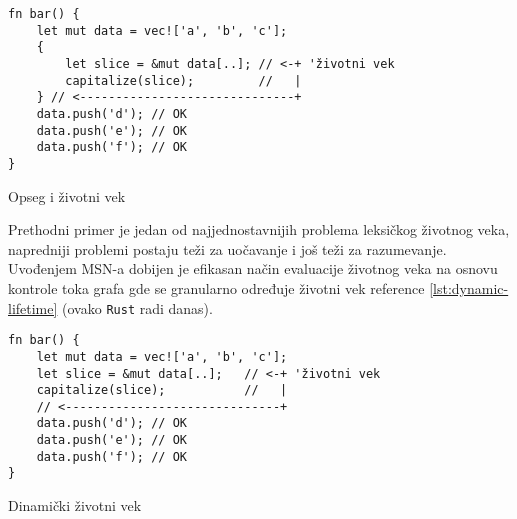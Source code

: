 \begin{listing}[H]
\begin{verbatim}
fn bar() {
    let mut data = vec!['a', 'b', 'c'];
    {
        let slice = &mut data[..]; // <-+ 'životni vek
        capitalize(slice);         //   |
    } // <------------------------------+
    data.push('d'); // OK
    data.push('e'); // OK
    data.push('f'); // OK
}
\end{verbatim}
\caption{Opseg i životni vek}
\label{lst:lexical-lifetime-ok}
\end{listing}

Prethodni primer je jedan od najjednostavnijih problema leksičkog životnog veka, napredniji problemi postaju teži za uočavanje i još teži za razumevanje.
Uvođenjem MSN-a dobijen je efikasan način evaluacije životnog veka na osnovu kontrole toka grafa gde se granularno određuje životni vek reference \ref{lst:dynamic-lifetime} (ovako \verb|Rust| radi danas).

\begin{listing}[H]
\begin{verbatim}
fn bar() {
    let mut data = vec!['a', 'b', 'c'];
    let slice = &mut data[..];   // <-+ 'životni vek
    capitalize(slice);           //   |
    // <------------------------------+
    data.push('d'); // OK
    data.push('e'); // OK
    data.push('f'); // OK
} 
\end{verbatim}
\caption{Dinamički životni vek}
\label{lst:dynamic-lifetime}
\end{listing}